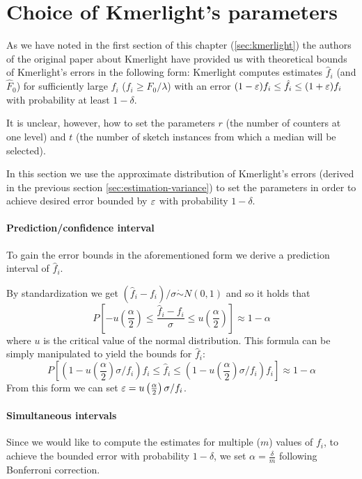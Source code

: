 \section{Choice of Kmerlight's parameters}
\label{sec:parameters-choice}

As we have noted in the first section of this chapter (\ref{sec:kmerlight})
the authors of the original paper about Kmerlight \cite{Sivadasan2016} have
provided us with theoretical bounds of Kmerlight's errors in the following form:
Kmerlight computes estimates $\hat f_i$ (and $\hat F_0$) for sufficiently large
$f_i$ ($f_i \geq F_0 / \lambda$) with an error $(1-\varepsilon)f_i \leq \hat f_i \leq (1+\varepsilon)f_i$
with probability at least $1 - \delta$.

It is unclear, however, how to set the parameters $r$ (the number of counters at one level) 
and $t$ (the number of sketch instances from which a median will be selected).

In this section we use the approximate distribution of Kmerlight's errors (derived in the
previous section \ref{sec:estimation-variance}) to set the parameters in order to achieve
desired error bounded by $\varepsilon$ with probability $1-\delta$.

\paragraph{Prediction/confidence interval} To gain the error bounds
in the aforementioned form we derive a prediction interval of $\hat f_i$. 

By standardization we get $(\hat f_i - f_i)/\sigma \dot\sim N(0,1)$ and so it holds that
$$P\left[-u\left(\frac{\alpha}{2}\right) \leq \frac{\hat f_i - f_i}{\sigma} \leq u\left(\frac{\alpha}{2}\right) \right] \approx 1 - \alpha$$
where $u$ is the critical value of the normal distribution. This formula can be simply
manipulated to yield the bounds for $\hat f_i$:
$$P\left[\left(1-u\left(\frac{\alpha}{2}\right)\sigma/f_i\right) f_i \leq \hat f_i \leq \left(1-u\left(\frac{\alpha}{2}\right)\sigma/f_i\right) f_i \right] \approx 1 - \alpha$$
From this form we can set $\varepsilon = u\left(\frac{\alpha}{2}\right)\sigma/f_i$.

\paragraph{Simultaneous intervals} Since we would like to compute the estimates
for multiple ($m$) values of $f_i$, to achieve the bounded error with probability
$1 - \delta$, we set $\alpha = \frac{\delta}{m}$ following Bonferroni correction.

